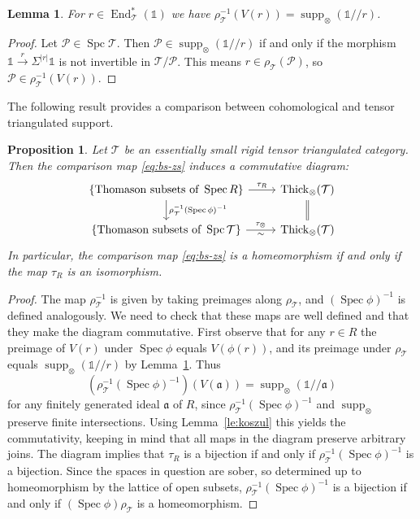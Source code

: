 \documentclass{amsart}[a4]
\newtheorem{lemma}[theorem]{Lemma}
\newtheorem{proposition}[theorem]{Proposition}
\theoremstyle{definition}
\theoremstyle{remark}
\numberwithin{equation}{section}
\newcommand{\End}{\operatorname{End}}
\newcommand{\Spc}{\operatorname{Spc}}
\newcommand{\Spec}{\operatorname{Spec}}
\newcommand{\supp}{\operatorname{supp}}
\newcommand{\Thick}{\operatorname{Thick}}
\newcommand{\kos}[2]{{#1}/\!\!/{#2}}
\newcommand{\cat}{\mathcal}
\newcommand{\one}{\mathds 1}
\newcommand{\fa}{\mathfrak{a}}
\newcommand{\Si}{\Sigma}
\let\Sigma\varSigma
\begin{document}
\begin{lemma}\label{le:comparison}
For $r\in\End^*_\cat T(\one)$ we have $\rho^{-1}_\cat T(V(r))=\supp_\otimes(\kos{\one}{r})$.
\end{lemma}
\begin{proof}
  Let $\cat P\in\Spc\cat T$. Then $\cat
  P\in\supp_\otimes(\kos{\one}{r})$ if and only if the morphism
  $\one\xrightarrow{r}\Si^{|r|}\one$ is not invertible in $\cat T/\cat P$. This
  means $r\in\rho_\cat T(\cat P)$, so $\cat P\in \rho^{-1}_\cat T(V(r))$.
\end{proof}


The following result provides a comparison between cohomological and
tensor triangulated support.

\begin{proposition}
\label{pr:bs-lattices}
  Let $\cat T$ be an essentially small rigid tensor triangulated
  category. Then the comparison map \eqref{eq:bs-zs} induces a
  commutative diagram:
\begin{equation*}
  \begin{tikzcd}
    \{\text{Thomason subsets of }\Spec
    R\} \ar[r,"\tau_R"]\ar[d,"\rho^{-1}_{\cat T}(\Spec\phi)^{-1}"] &\Thick_\otimes(\cat T)\ar[d,equal]\\
    \{\text{Thomason subsets of }\Spc\cat T\} \ar[r,"\tau_\otimes", "\sim" swap]&\Thick_\otimes(\cat T)
\end{tikzcd}
\end{equation*}
In particular, the comparison map  \eqref{eq:bs-zs} is a homeomorphism if and only if the
  map $\tau_R$ is an isomorphism.
\end{proposition}

\begin{proof}
  The map $\rho^{-1}_{\cat T}$ is given by taking preimages along
  $\rho_{\cat T}$, and $(\Spec\phi)^{-1}$ is defined analogously.  We
  need to check that these maps are well defined and that they make
  the diagram commutative. First observe that for any $r\in R$ the
  preimage of $V(r)$ under $\Spec\phi$ equals $V(\phi(r))$, and its
  preimage under $\rho_{\cat T}$ equals $\supp_\otimes(\kos{\one}{r})$
  by Lemma~\ref{le:comparison}.  Thus
  \[
  (\rho^{-1}_{\cat T}(\Spec\phi)^{-1})(V(\fa))=\supp_\otimes(\kos{\one}{\fa})
  \] 
  for any finitely generated ideal $\fa$ of $R$, since
  $\rho^{-1}_{\cat T}(\Spec\phi)^{-1}$ and $\supp_\otimes$ preserve finite
  intersections.  Using Lemma~\ref{le:koszul} this yields the
  commutativity, keeping in mind that all maps in the diagram preserve
  arbitrary joins. The diagram implies that $\tau_R$ is a bijection if
  and only if $\rho^{-1}_{\cat T}(\Spec\phi)^{-1}$ is a bijection. Since the
  spaces in question are sober, so determined up to homeomorphism by
  the lattice of open subsets, $\rho^{-1}_{\cat T}(\Spec\phi)^{-1}$ is a
  bijection if and only if $(\Spec\phi)\rho_{\cat T}$ is a
  homeomorphism.
\end{proof}
\end{document}
